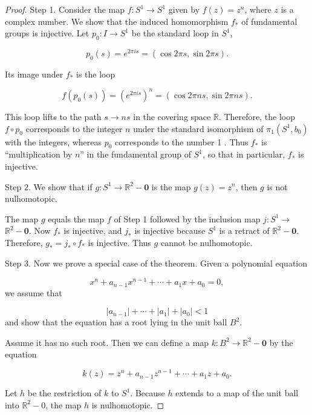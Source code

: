 \begin{proof}
Step 1. Consider the map \(f : S^{1} \rightarrow {S}^{1}\) given by \(f( z) = z^{n}\), where \(z\) is a complex number. We show that the induced homomorphism \(f_{ * }\) of fundamental groups is injective.
Let \(p_{0} : I \rightarrow {S}^{1}\) be the standard loop in \(S^{1}\),

\[
p_{0}( s) = e^{2\pi is} = ( {\cos {2\pi s},\sin {2\pi s}}).
\]

Its image under \(f_{ * }\) is the loop

\[
f( {p_{0}( s) }) = {( e^{2\pi is}) }^{n} = ( {\cos {2\pi ns},\sin {2\pi ns}}).
\]

This loop lifts to the path \(s \rightarrow {ns}\) in the covering space \(\mathbb{R}\). Therefore, the loop \(f \circ {p}_{0}\) corresponds to the integer \(n\) under the standard isomorphism of \({\pi }_{1}( {S^{1},b_{0}})\) with the integers, whereas \(p_{0}\) corresponds to the number 1 . Thus \(f_{ * }\) is ``multiplication by \(n\)'' in the fundamental group of \(S^{1}\), so that in particular, \(f_{ * }\) is injective.

Step 2. We show that if \(g : S^{1} \rightarrow {\mathbb{R}}^{2} - \mathbf{0}\) is the map \(g( z) = z^{n}\), then \(g\) is not nulhomotopic.

The map \(g\) equals the map \(f\) of Step 1 followed by the inclusion map \(j : S^{1} \rightarrow\) \(\mathbb{R}^{2} - \mathbf{0}\). Now \(f_{ * }\) is injective, and \(j_{ * }\) is injective because \(S^{1}\) is a retract of \(\mathbb{R}^{2} - \mathbf{0}\). Therefore, \(g_{ * } = j_{ * } \circ {f}_{ * }\) is injective. Thus \(g\) cannot be nulhomotopic.

Step 3. Now we prove a special case of the theorem. Given a polynomial equation

\[
x^{n} + a_{n - 1}x^{n - 1} + \cdots + a_{1}x + a_{0} = 0,
\]
we assume that

\[
| a_{n - 1}| + \cdots + | a_{1}| + | a_{0}| < 1
\]
and show that the equation has a root lying in the unit ball \(B^{2}\).

Assume it has no such root. Then we can define a map \(k : B^{2} \rightarrow {\mathbb{R}}^{2} - \mathbf{0}\) by the equation

\[
k( z) = z^{n} + a_{n - 1}z^{n - 1} + \cdots + a_{1}z + a_{0}.
\]

Let \(h\) be the restriction of \(k\) to \(S^{1}\). Because \(h\) extends to a map of the unit ball into \(\mathbb{R}^{2} - 0\), the map \(h\) is nulhomotopic.


\end{proof}
